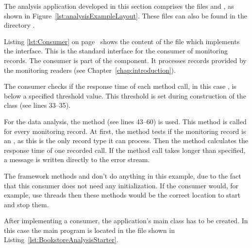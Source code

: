 \noindent The analysis application developed in this section comprises the files %
 and , as shown in Figure~\ref{lst:analysisExampleLayout}. %
These files can also be found in the directory \dir{\manualInstrumentedBookstoreApplicationDirDistro{}/}. 

Listing \ref{lst:Consumer} on page~\pageref{lst:Consumer} shows the content of the  file which implements the  interface. This is the standard interface for the consumer of \Kieker{} monitoring records. The consumer is part of the \KiekerAnalysisPart{} component. It processes records provided by the monitoring readers (see Chapter~\ref{chap:introduction}). %

\setJavaCodeListing       

%

\noindent The consumer checks if the response time of each method call, in this case , is below %
a specified threshold value. %
This threshold is set during construction of the  class (see lines 33--35). 


For the data analysis, the method  (see lines 43--60) is used. %
This method is called for every monitoring record. At first, the method tests if %
the monitoring record is an , as %
this is the only record type it can process. Then the method calculates the %
response time of one recorded  call. If the method call takes %
longer than specified, a message is written directly to the error stream.

The framework methods  and  don't do anything %
in this example, due to the fact that this consumer does not need any initialization. %
If the consumer would, for example, use threads then these methods would be the %
correct location to start and stop them.

After implementing a consumer, the application's main class has to be created. %
In this case the main program is located in the  %
file shown in Listing~\ref{lst:BookstoreAnalysisStarter}.

